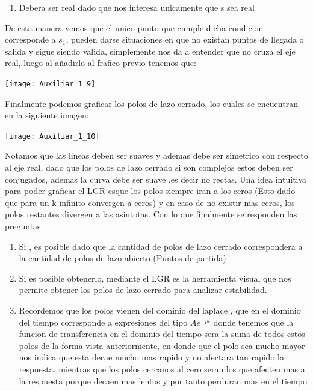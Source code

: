 \documentclass[
  11pt,
  letterpaper,
   addpoints,
   answers
  ]{exam}
\begin{document}
\begin{questions}
\begin{solution}
\begin{enumerate}
    \item Debera ser real dado que nos interesa unicamente que s sea real
\end{enumerate}
De esta manera vemos que el unico punto que cumple dicha condicion corresponde a $s_{1}$, pueden darse situaciones en que no existan puntos de llegada o salida y sigue siendo valida, simplemente nos da a entender que no cruza el eje real, luego al añadirlo al frafico previo tenemos que:
\begin{center}
    \texttt{[image: Auxiliar\_1\_9]}
  \end{center}
Finalmente podemos graficar los polos de lazo cerrado, los cuales se encuentran en la siguiente imagen:
\begin{center}
    \texttt{[image: Auxiliar\_1\_10]}
  \end{center}
Notamos que las lineas deben ser suaves y ademas debe ser simetrico con respecto al eje real, dado que los polos de lazo cerrado si son complejos estos deben ser conjugados, ademas la curva debe ser suave ,es decir no rectas. Una idea intuitiva para poder graficar el LGR esque los polos siempre iran a los ceros (Esto dado que para un k infinito convergen a ceros) y en caso de no existir mas ceros, los polos restantes divergen a las asintotas. Con lo que finalmente se responden las preguntas.
\begin{enumerate}
    \item Si , es posible dado que la cantidad de polos de lazo cerrado correspondera a la cantidad de polos de lazo abierto (Puntos de partida)
    \item Si es posible obtenerlo, mediante el LGR es la herramienta visual que nos permite obtener los polos de lazo cerrado para analizar estabilidad.
    \item Recordemos que los polos vienen del dominio del laplace , que en el dominio del tiempo corresponde a expresiones del tipo $Ae^{-pt}$ donde tenemos que la funcion de transferencia en el dominio del tiempo sera la suma de todos estos polos de la forma vista anteriormente, en donde que el polo sea mucho mayor nos indica que esta decae mucho mas rapido y no afectara tan rapido la respuesta,  mientras que los polos cercanos al cero seran los que afecten mas a la respuesta porque decaen mas lentos y por tanto perduran mas en el tiempo
\end{enumerate}


\end{solution}


\end{questions}
\newpage
\end{document}
